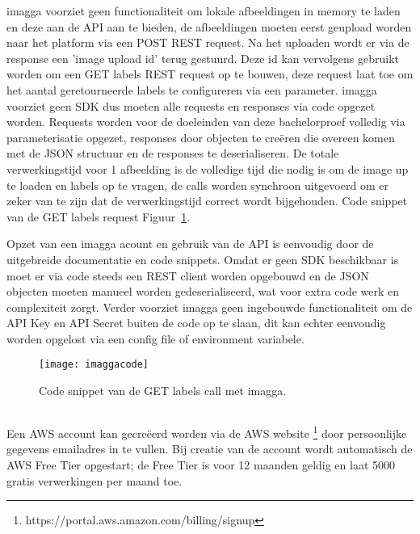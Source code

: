 imagga voorziet geen functionaliteit om lokale afbeeldingen in memory te laden en deze aan de API aan te bieden, de afbeeldingen moeten eerst geupload worden naar het platform via een POST REST request. Na het uploaden wordt er via de response een 'image upload id' terug gestuurd. Deze id kan vervolgens gebruikt worden om een GET labels REST request op te bouwen, deze request laat toe om het aantal geretourneerde labels te configureren via een parameter. imagga voorziet geen SDK dus moeten alle requests en responses via code opgezet worden. Requests worden voor de doeleinden van deze bachelorproef volledig via parameterisatie opgezet, responses door objecten te creëren die overeen komen met de JSON structuur en de responses te deserialiseren. De totale verwerkingstijd voor 1 afbeelding is de volledige tijd die nodig is om de image up te loaden en labels op te vragen, de calls worden synchroon uitgevoerd om er zeker van te zijn dat de verwerkingstijd correct wordt bijgehouden. Code snippet van de GET labels request Figuur~\ref{fig:imaggacode}.

Opzet van een imagga acount en gebruik van de API is eenvoudig door de uitgebreide documentatie en code snippets. Omdat er geen SDK beschikbaar is moet er via code steeds een REST client worden opgebouwd en de JSON objecten moeten manueel worden gedeserialiseerd, wat voor extra code werk en complexiteit zorgt. Verder voorziet imagga geen ingebouwde functionaliteit om de API Key en API Secret buiten de code op te slaan, dit kan echter eenvoudig worden opgelost via een config file of environment variabele.

\begin{figure}
    \centering
    \texttt{[image: imaggacode]}
    \caption{Code snippet van de GET labels call met imagga.}
    \label{fig:imaggacode}
\end{figure}

\subsection{}
\label{sec:integration-AWS}
Een AWS account kan gecreëerd worden via de AWS website \footnote{https://portal.aws.amazon.com/billing/signup} door persoonlijke gegevens emailadres in te vullen. Bij creatie van de account wordt automatisch de AWS Free Tier opgestart; de Free Tier is voor 12 maanden geldig en laat 5000 gratis verwerkingen per maand toe.

